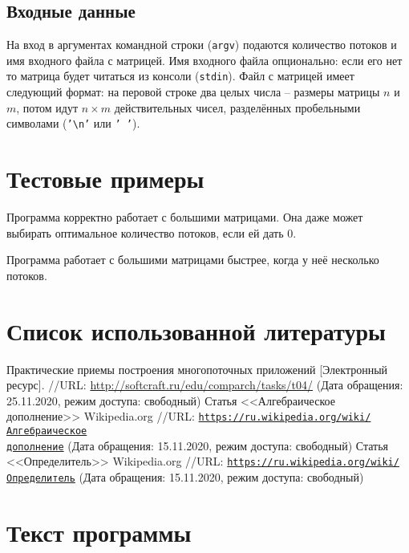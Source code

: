\documentclass[a4paper]{article}
\begin{document}
  \subsection{Входные данные}
  На вход в аргументах командной строки (\texttt{argv}) подаются количество потоков и имя входного файла с матрицей.
  Имя входного файла опционально: если его нет то матрица будет читаться из консоли (\texttt{stdin}).
  Файл с матрицей имеет следующий формат: на перовой строке два целых числа -- размеры матрицы $n$ и $m$,
  потом идут $n \times m$ действительных чисел, разделённых пробельными символами (\texttt{'\textbackslash{}n'} или \texttt{' '}).

  \newpage
  \section{Тестовые примеры}
  Программа корректно работает с большими матрицами.
  Она даже может выбирать оптимальное количество потоков, если ей дать 0.

  Программа работает с большими матрицами быстрее, когда у неё несколько потоков.

  \newpage
  \section{Список использованной литературы}
  \begin{thebibliography}{3}
     Практические приемы построения многопоточных приложений [Электронный ресурс].
      //URL: \url{http://softcraft.ru/edu/comparch/tasks/t04/} (Дата обращения: 25.11.2020, режим доступа: свободный)
     Статья <<Алгебраическое дополнение>> Wikipedia.org
      //URL: \href{https://ru.wikipedia.org/wiki/%D0%90%D0%BB%D0%B3%D0%B5%D0%B1%D1%80%D0%B0%D0%B8%D1%87%D0%B5%D1%81%D0%BA%D0%BE%D0%B5_%D0%B4%D0%BE%D0%BF%D0%BE%D0%BB%D0%BD%D0%B5%D0%BD%D0%B8%D0%B5}
      {\texttt{https://ru.wikipedia.org/wiki/Алгебраическое\\\-дополнение}}
      (Дата обращения: 15.11.2020, режим доступа: свободный)
     Статья <<Определитель>> Wikipedia.org
      //URL: \href{https://ru.wikipedia.org/wiki/%D0%9E%D0%BF%D1%80%D0%B5%D0%B4%D0%B5%D0%BB%D0%B8%D1%82%D0%B5%D0%BB%D1%8C}
      {\texttt{https://ru.wikipedia.org/wiki/Определитель}}
      (Дата обращения: 15.11.2020, режим доступа: свободный)
  \end{thebibliography}

  \newpage
  \section{Текст программы}
  
\end{document}
